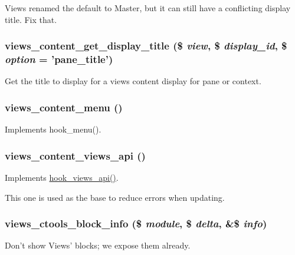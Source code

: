 Views renamed the default to Master, but it can still have a conflicting display title. Fix that. \hypertarget{views__content_8module_afc263b5835dd62ae6774d8720b983a29}{
\subsubsection[{views\_\-content\_\-get\_\-display\_\-title}]{\setlength{\rightskip}{0pt plus 5cm}views\_\-content\_\-get\_\-display\_\-title (\$ {\em view}, \/  \$ {\em display\_\-id}, \/  \$ {\em option} = {\ttfamily 'pane\_\-title'})}}
\label{views__content_8module_afc263b5835dd62ae6774d8720b983a29}
Get the title to display for a views content display for pane or context. \hypertarget{views__content_8module_a8280857d807868e12658b7ce5f582040}{
\subsubsection[{views\_\-content\_\-menu}]{\setlength{\rightskip}{0pt plus 5cm}views\_\-content\_\-menu ()}}
\label{views__content_8module_a8280857d807868e12658b7ce5f582040}
Implements hook\_\-menu(). \hypertarget{views__content_8module_a8fd4ad93e1b822d81a655961270cc26b}{
\subsubsection[{views\_\-content\_\-views\_\-api}]{\setlength{\rightskip}{0pt plus 5cm}views\_\-content\_\-views\_\-api ()}}
\label{views__content_8module_a8fd4ad93e1b822d81a655961270cc26b}
Implements \hyperlink{group__views__hooks_gac67ffd4a2f61f9814ee37b541c472c47}{hook\_\-views\_\-api()}.

This one is used as the base to reduce errors when updating. \hypertarget{views__content_8module_af683ec2b8c9e15e7badc8139d5c7f99f}{
\subsubsection[{views\_\-ctools\_\-block\_\-info}]{\setlength{\rightskip}{0pt plus 5cm}views\_\-ctools\_\-block\_\-info (\$ {\em module}, \/  \$ {\em delta}, \/  \&\$ {\em info})}}
\label{views__content_8module_af683ec2b8c9e15e7badc8139d5c7f99f}
Don't show Views' blocks; we expose them already. 